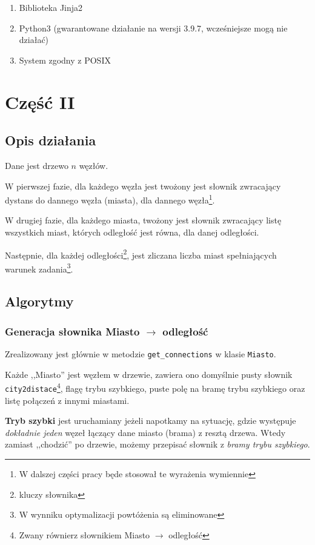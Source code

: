 \documentclass[12pt,a4paper]{article}
\begin{document}
    \begin{enumerate}
            \item Biblioteka Jinja2
            \item Python3 (gwarantowane działanie na wersji 3.9.7, wcześniejsze mogą nie
                działać)
            \item System zgodny z POSIX
    \end{enumerate}

	\newpage
	\section*{Część II}
	\subsection*{Opis działania} 
	
    Dane jest drzewo $n$ węzłów.

    W pierwszej fazie, dla każdego węzła jest twożony jest słownik zwracający
    dystans do dannego węzła (miasta), dla dannego węzła\footnote{W dalszej
    części pracy będe stosował te wyrażenia wymiennie}.

    W drugiej fazie, dla każdego miasta, twożony jest słownik zwracający listę
    wszystkich miast, których odległość jest równa, dla danej odległości.

    Następnie, dla każdej odległości\footnote{kluczy słownika}, jest zliczana
    liczba miast spełniających warunek zadania\footnote{W wynniku optymalizacji
    powtóżenia są eliminowane}.
	
	\subsection*{Algorytmy}
    
    \subsubsection*{Generacja słownika Miasto $\rightarrow$ odległość}

	Zrealizowany jest głównie w metodzie \texttt{get\_connections} w klasie \texttt{Miasto}.

	Każde ,,Miasto'' jest węzłem w drzewie, zawiera ono domyślnie pusty słownik \texttt{city2distace}\footnote{Zwany równierz słownikiem Miasto $\rightarrow$ odległość}, flagę trybu szybkiego, puste polę na bramę trybu szybkiego oraz listę połączeń z innymi miastami.

	\textbf{Tryb szybki} jest uruchamiany jeżeli napotkamy na sytuację, gdzie występuje \emph{dokładnie jeden} węzeł łączący dane miasto (brama) z resztą drzewa. Wtedy zamiast ,,chodzić'' po drzewie, możemy przepisać słownik z \emph{bramy trybu szybkiego}.
    
\end{document}
